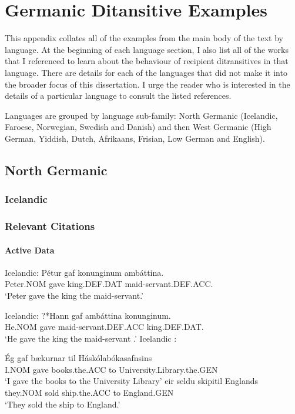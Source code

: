 \chapter{Germanic Ditansitive Examples}
This appendix collates all of the examples from the main body of the text by language. At the beginning of each language section, I also list all of the works that I referenced to learn about the behaviour of recipient ditransitives in that language. There are details for each of the languages that did not make it into the broader focus of this dissertation. I urge the reader who is interested in the details of a particular language to consult the listed references.

Languages are grouped by language sub-family: North Germanic (Icelandic, Faroese, Norwegian, Swedish and Danish) and then West Germanic (High German, Yiddish, Dutch, Afrikaans, Frisian, Low German and English).




\section{North Germanic}
\subsection{Icelandic}
\subsection{Relevant Citations}
\cite{}
\subsubsection{Active Data}
\begin{exe}
	 Icelandic:
		\gll P\'{e}tur gaf konunginum amb\'{a}ttina.\\
		Peter.NOM gave king.DEF.DAT maid-servant.DEF.ACC.\\
		\trans `Peter gave the king the maid-servant.'

	 Icelandic:
		\gll ?*Hann gaf amb\'attina konunginum.\\
		He.NOM gave maid-servant.DEF.ACC king.DEF.DAT. \\
		\trans `He gave the king the maid-servant \citep[ex 14b]{Dehe.2004}.'
	 Icelandic \citep{Thrainsson.2007}:
		\begin{xlist}
		\ex \gll \'{E}g gaf b\ae kurnar til H\'ask\'olab\'okasafnsins\\
		I.NOM gave books.the.ACC to University.Library.the.GEN\\
		\trans `I gave the books to the University Library'
		\ex \gll \th eir seldu skipi\dh til Englands\\
		they.NOM sold ship.the.ACC to England.GEN\\
		\trans `They sold the ship to England.'
		\end{xlist}

\end{exe}
